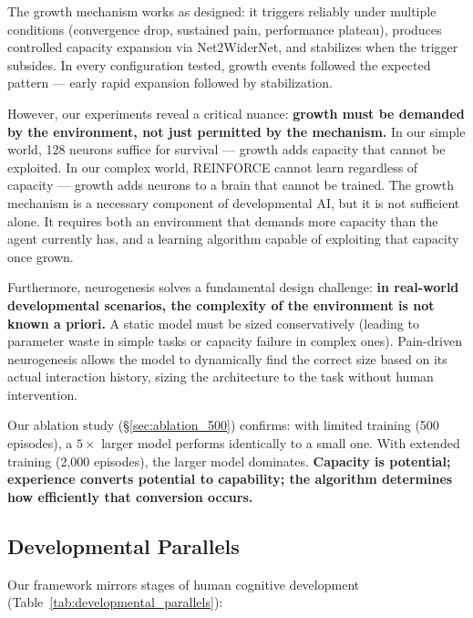 \documentclass{article}
\begin{document}
The growth mechanism works as designed: it triggers reliably under multiple conditions (convergence drop, sustained pain, performance plateau), produces controlled capacity expansion via Net2WiderNet, and stabilizes when the trigger subsides. In every configuration tested, growth events followed the expected pattern --- early rapid expansion followed by stabilization.

However, our experiments reveal a critical nuance: \textbf{growth must be demanded by the environment, not just permitted by the mechanism.} In our simple world, 128 neurons suffice for survival --- growth adds capacity that cannot be exploited. In our complex world, REINFORCE cannot learn regardless of capacity --- growth adds neurons to a brain that cannot be trained. The growth mechanism is a necessary component of developmental AI, but it is not sufficient alone. It requires both an environment that demands more capacity than the agent currently has, and a learning algorithm capable of exploiting that capacity once grown.

Furthermore, neurogenesis solves a fundamental design challenge: \textbf{in real-world developmental scenarios, the complexity of the environment is not known a priori.} A static model must be sized conservatively (leading to parameter waste in simple tasks or capacity failure in complex ones). Pain-driven neurogenesis allows the model to dynamically find the correct size based on its actual interaction history, sizing the architecture to the task without human intervention.

Our ablation study (\S\ref{sec:ablation_500}) confirms: with limited training (500 episodes), a $5\times$ larger model performs identically to a small one. With extended training (2,000 episodes), the larger model dominates. \textbf{Capacity is potential; experience converts potential to capability; the algorithm determines how efficiently that conversion occurs.}

\subsection{Developmental Parallels}
Our framework mirrors stages of human cognitive development (Table~\ref{tab:developmental_parallels}):
\end{document}
